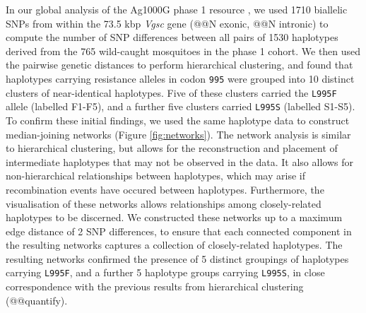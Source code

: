 \documentclass[a4paper,11pt,abstracton,hidelinks]{scrartcl}
\begin{document}
%
In our global analysis of the Ag1000G phase 1 resource \cite{Ag1000gConsortium2017}, we used 1710 biallelic SNPs from within the 73.5 kbp \textit{Vgsc} gene (@@N exonic, @@N intronic) to compute the number of SNP differences between all pairs of 1530 haplotypes derived from the 765 wild-caught mosquitoes in the phase 1 cohort.
%
We then used the pairwise genetic distances to perform hierarchical clustering, and found that haplotypes carrying resistance alleles in codon \texttt{995} were grouped into 10 distinct clusters of near-identical haplotypes.
%
Five of these clusters carried the \texttt{L995F} allele (labelled F1-F5), and a further five clusters carried \texttt{L995S} (labelled S1-S5).
%
To confirm these initial findings, we used the same haplotype data to construct median-joining networks (Figure \ref{fig:networks}).
%
The network analysis is similar to hierarchical clustering, but allows for the reconstruction and placement of intermediate haplotypes that may not be observed in the data. 
%
It also allows for non-hierarchical relationships between haplotypes, which may arise if recombination events have occured between haplotypes.
%
Furthermore, the visualisation of these networks allows relationships among closely-related haplotypes to be discerned.
%
We constructed these networks up to a maximum edge distance of 2 SNP differences, to ensure that each connected component in the resulting networks captures a collection of closely-related haplotypes.
%
The resulting networks confirmed the presence of 5 distinct groupings of haplotypes carrying \texttt{L995F}, and a further 5 haplotype groups carrying \texttt{L995S}, in close correspondence with the previous results from hierarchical clustering (@@quantify).
%
\end{document}
